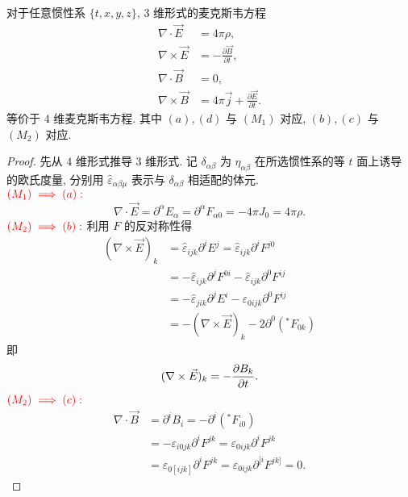 \begin{theorem}
    对于任意惯性系 $ \{t,x,y,z\} $, $ 3 $ 维形式的麦克斯韦方程 
    \begin{align*}
        \nabla\cdot\vec{E}&=4\pi\rho,\tag{a}\\ 
        \nabla\times\vec{E}&=-\frac{\partial\vec{B}}{\partial t},\tag{b}\\ 
        \nabla\cdot\vec{B}&=0,\tag{c}\\ 
        \nabla\times\vec{B}&=4\pi\vec{j}+\frac{\partial\vec{E}}{\partial t}.\tag{d}
    \end{align*}
    等价于 $4$ 维麦克斯韦方程. 其中 $ (a), (d) $ 与 $ (M_1) $ 对应, $ (b), (c) $ 与 $ (M_2) $ 对应.
\end{theorem}
\begin{proof}
    先从 $ 4 $ 维形式推导 $ 3 $ 维形式.
    记 $ \delta_{\alpha\beta} $ 为 $ \eta_{\alpha\beta} $ 在所选惯性系的等 $ t $ 面上诱导的欧氏度量, 分别用 $\hat{\varepsilon}_{\alpha\beta\mu}$ 表示与 $\delta_{\alpha\beta}$ 相适配的体元.\vspace{1ex}\\
    $\textcolor{red}{(M_1)\implies(a):}$\keepline
    \[ \nabla\cdot\vec{E}=\partial^\alpha E_\alpha=\partial^\alpha F_{\alpha 0}=-4\pi J_0=4\pi\rho. \]
    $\textcolor{red}{(M_2)\implies(b):}$ 利用 $F$ 的反对称性得\vspace{1.5ex}
    \begin{align*}
        (\nabla\times\vec{E})_k&=\hat{\varepsilon}_{ijk}\partial^iE^j=\hat{\varepsilon}_{ijk}\partial^iF^{j0}\\
        &=-\hat{\varepsilon}_{ijk}\partial^jF^{0i}-\hat{\varepsilon}_{ijk}\partial^0F^{ij}\\
        &=-\hat{\varepsilon}_{jik}\partial^jE^i-\varepsilon_{0ijk}\partial^0F^{ij}\\
        &=-(\nabla\times\vec{E})_k-2\partial^0({}^{*}\!F_{0k})
    \end{align*}
    即
    \[ (\nabla\times\vec{E})_k=-\frac{\partial B_k}{\partial t}.\vspace{1ex} \] 
    $\textcolor{red}{(M_2)\implies(c):}$\keepline
    \begin{align*}
        \nabla\cdot\vec{B} &= \partial^i B_i = -\partial^i({}^{*}\!F_{i0})\\
        &=-\varepsilon_{i0jk}\partial^iF^{jk}= \varepsilon_{0ijk}\partial^i F^{jk} \\
        &= \varepsilon_{0[ijk]}\partial^{i}F^{jk}=\varepsilon_{0ijk}\partial^{[i}F^{jk]}=0.
    \end{align*}

\end{proof}
